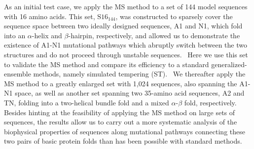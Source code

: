 \documentclass[
aip,
rsi,%
amsmath,amssymb,
reprint,%
]{revtex4-1}
\newcommand {\SR}		{${\mathrm{S16}_{144}}$}
\begin{document}
As an initial test case, we apply the MS method to a set of 144 model sequences with 16 amino acids. This set, {\SR}, was constructed to sparsely cover the sequence space between two ideally designed sequences, A1 and N1, which fold into an $\alpha$-helix and $\beta$-hairpin, respectively, and allowed us to demonstrate the existence of A1-N1 mutational pathways which abruptly switch between the two structures and do not proceed through unstable sequences.~\cite{Holzgrafe2014} Here we use this set to validate the MS method and compare its efficiency to a standard generalized-ensemble methods, namely simulated tempering (ST).~\cite{Marinari1992,Lyubartsev1992} We thereafter apply the MS method to a greatly enlarged set with 1,024 sequences, also spanning the A1-N1 space, as well as another set spanning two 35-amino acid sequences, A2 and TN, folding into a two-helical bundle fold and a mixed $\alpha$-$\beta$ fold, respectively. Besides hinting at the feasibility of applying the MS method on large sets of sequences, the results allow us to carry out a more systematic analysis of the biophysical properties of sequences along mutational pathways connecting these two pairs of basic protein folds than has been possible with standard methods.~\cite{Holzgrafe2014,Holzgrafe2015} 






\end{document}
